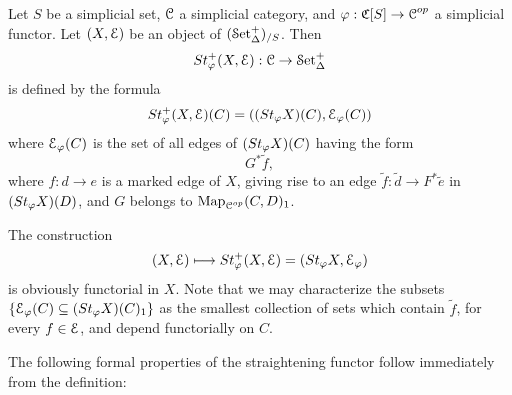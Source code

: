 \begin{definition}
Let $S$ be a simplicial set, $\operatorname{\mathcal{C}}$ a simplicial category, and $\varphi: \operatorname{\mathfrak{C}}[S] \rightarrow \operatorname{\mathcal{C}}^{op}$ a simplicial functor. Let $(X, \operatorname{\mathcal{E}})$ be an object of $(\operatorname{\mathcal{S}et_{\Delta}^{+}})_{/S}$. Then
$$ St^{+}_{\varphi}(X, \operatorname{\mathcal{E}}): \operatorname{\mathcal{C}} \rightarrow \operatorname{\mathcal{S}et_{\Delta}^{+}}$$
is defined by the formula
$$ St^{+}_{\varphi}(X, \operatorname{\mathcal{E}})(C) = ((St_{\varphi}X)(C), \operatorname{\mathcal{E}}_{\varphi}(C))$$
where $\operatorname{\mathcal{E}}_{\varphi}(C)$ is the set of all edges of $(St_{\varphi}X)(C)$ having the form
$$ G^{\ast} \widetilde{f},$$ where $f: d \rightarrow e$ is a marked edge of $X$, giving rise to an
edge $\widetilde{f}: \widetilde{d} \rightarrow F^{\ast} \widetilde{e}$ in $(St_{\varphi}X)(D)$, and $G$ belongs to $\operatorname{{Map}}_{\operatorname{\mathcal{C}}^{op}}(C,D)_1$.
\end{definition}

\begin{remark}
The construction
$$ (X, \operatorname{\mathcal{E}}) \longmapsto St^{+}_{\varphi}(X, \operatorname{\mathcal{E}}) = (St_{\varphi}X, \operatorname{\mathcal{E}}_{\varphi})$$
is obviously functorial in $X$. Note that we may characterize the subsets
$\{ \operatorname{\mathcal{E}}_{\varphi}(C) \subseteq (St_{\varphi} X)(C)_1 \}$ as the smallest collection of sets which contain
$\widetilde{f}$, for every $f \in \operatorname{\mathcal{E}}$, and depend functorially on $C$.
\end{remark}

The following formal properties of the straightening functor follow immediately from the definition:

